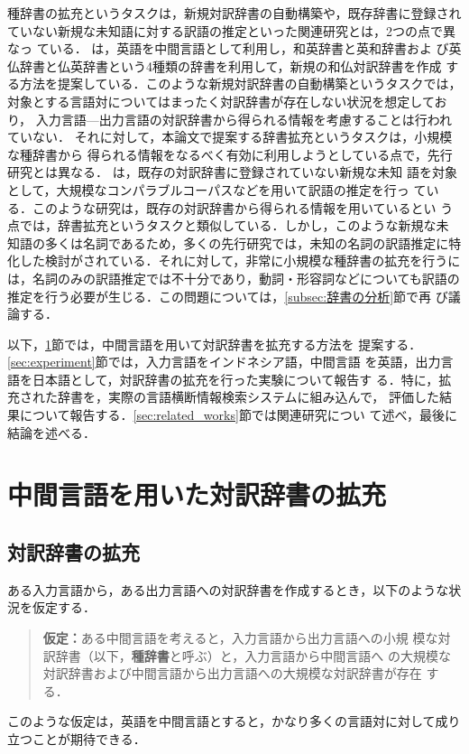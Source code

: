 \documentclass[japanese]{jnlp_1.4}
\begin{document}
種辞書の拡充というタスクは，新規対訳辞書の自動構築や，既存辞書に登録され
ていない新規な未知語に対する訳語の推定といった関連研究とは，2つの点で異なっ
ている．
\cite{日仏対訳辞書}は，英語を中間言語として利用し，和英辞書と英和辞書およ
び英仏辞書と仏英辞書という4種類の辞書を利用して，新規の和仏対訳辞書を作成
する方法を提案している．このような新規対訳辞書の自動構築というタスクでは，
対象とする言語対についてはまったく対訳辞書が存在しない状況を想定しており，
入力言語—出力言語の対訳辞書から得られる情報を考慮することは行われていない．
それに対して，本論文で提案する辞書拡充というタスクは，小規模な種辞書から
得られる情報をなるべく有効に利用しようとしている点で，先行研究とは異なる．
\cite{ウェブから対訳を推定}は，既存の対訳辞書に登録されていない新規な未知
語を対象として，大規模なコンパラブルコーパスなどを用いて訳語の推定を行っ
ている．このような研究は，既存の対訳辞書から得られる情報を用いているとい
う点では，辞書拡充というタスクと類似している．しかし，このような新規な未
知語の多くは名詞であるため，多くの先行研究では，未知の名詞の訳語推定に特
化した検討がされている．それに対して，非常に小規模な種辞書の拡充を行うに
は，名詞のみの訳語推定では不十分であり，動詞・形容詞などについても訳語の
推定を行う必要が生じる．この問題については，\ref{subsec:辞書の分析}節で再
び議論する．

以下，\ref{sec:expansion}節では，中間言語を用いて対訳辞書を拡充する方法を
提案する．\ref{sec:experiment}節では，入力言語をインドネシア語，中間言語
を英語，出力言語を日本語として，対訳辞書の拡充を行った実験について報告す
る．特に，拡充された辞書を，実際の言語横断情報検索システムに組み込んで，
評価した結果について報告する．\ref{sec:related_works}節では関連研究につい
て述べ，最後に結論を述べる．


\section{中間言語を用いた対訳辞書の拡充}
\label{sec:expansion}

\subsection{対訳辞書の拡充}


ある入力言語から，ある出力言語への対訳辞書を作成するとき，以下のような状
況を仮定する．
\begin{quote}
  \textbf{仮定：}ある中間言語を考えると，入力言語から出力言語への小規
  模な対訳辞書（以下，\textbf{種辞書}と呼ぶ）と，入力言語から中間言語へ
  の大規模な対訳辞書および中間言語から出力言語への大規模な対訳辞書が存在
  する．
\end{quote}
このような仮定は，英語を中間言語とすると，かなり多くの言語対に対して成り
立つことが期待できる．
\end{document}
